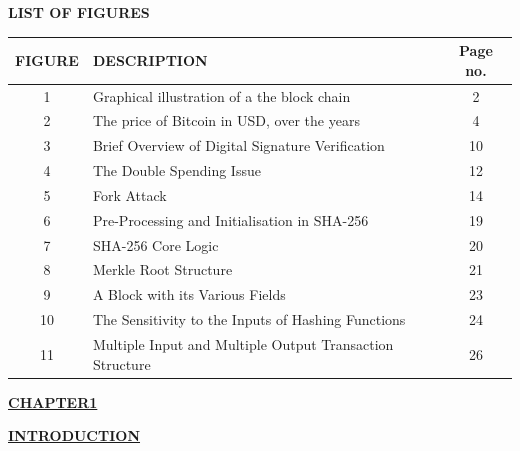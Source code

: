 \documentclass[12pt,a4paper]{report}
\newcommand{\blank}[1]{\hspace*{#1}}
\begin{document}
\begin{justify}
\newpage

\begin{center}\Large\textbf{LIST OF FIGURES}\end{center}

\vspace{10mm}

\begin{tabular}{|c |l| c|}\hline
\textbf{FIGURE} &  DESCRIPTION\blank{7cm} & \textbf{Page no.}\\ \hline
1 &  Graphical illustration of a the block chain  & 2 \\ \hline
2 & The price of Bitcoin in USD, over the years & 4\\ \hline
3 &  Brief Overview of Digital Signature Verification   & 10\\ \hline
4 &  The Double Spending Issue & 12\\ \hline
5 &  Fork Attack  & 14\\ \hline
6 &  Pre-Processing and Initialisation in SHA-256    & 19\\ \hline
7 &  SHA-256 Core Logic        &20\\ \hline
8 &   Merkle Root Structure    &21\\ \hline
9 &  A Block with its Various Fields   & 23\\ \hline
10 &  The Sensitivity to the Inputs of Hashing Functions  & 24\\ \hline
11 &  Multiple Input and Multiple Output Transaction Structure  & 26\\ \hline
\end{tabular}
\newpage
{}
\setcounter{page}{1}

\begin{center}\underline{  \Large\textbf{CHAPTER1}}\end{center}
\begin{center}\underline{ \Large \textbf{INTRODUCTION}}\end{center}

\vspace{10mm} 


\end{justify}
\end{document}
